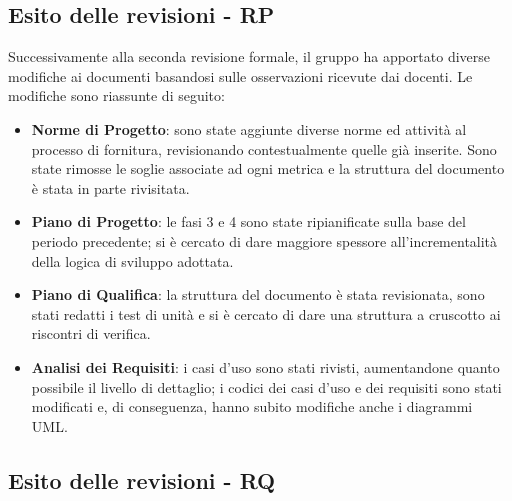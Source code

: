 \subsection{Esito delle revisioni - RP}	
Successivamente alla seconda revisione formale, il gruppo ha apportato diverse modifiche ai documenti basandosi sulle osservazioni ricevute dai docenti. Le modifiche sono riassunte di seguito:
	\begin{itemize}
		\item \textbf{Norme di Progetto}: sono state aggiunte diverse norme ed attività al processo di fornitura, revisionando contestualmente quelle già inserite. Sono state rimosse le soglie associate ad ogni metrica e la struttura del documento è stata in parte rivisitata.
		\item \textbf{Piano di Progetto}: le fasi 3 e 4 sono state ripianificate sulla base del periodo precedente; si è cercato di dare maggiore spessore all'incrementalità della logica di sviluppo adottata. 
		\item \textbf{Piano di Qualifica}: la struttura del documento è stata revisionata, sono stati redatti i test di unità e si è cercato di dare una struttura a cruscotto ai riscontri di verifica.
		\item \textbf{Analisi dei Requisiti}: i casi d'uso sono stati rivisti, aumentandone quanto possibile il livello di dettaglio; i codici dei casi d'uso e dei requisiti sono stati modificati e, di conseguenza, hanno subito modifiche anche i diagrammi UML.
	\end{itemize}

\subsection{Esito delle revisioni - RQ}	
\newpage
